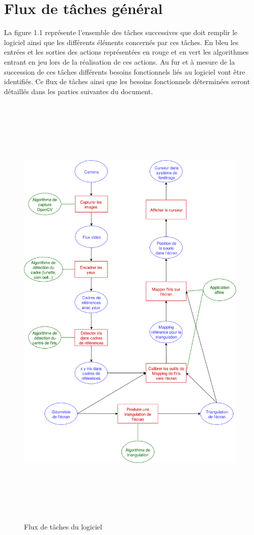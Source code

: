 \documentclass[a4paper, 12pt]{report}
\begin{document}
    \section*{Flux de tâches général}
    La figure 1.1 représente l'ensemble des tâches successives que doit remplir le logiciel ainsi que les différents éléments concernés par ces tâches. En bleu les entrées et les sorties des actions représentées en rouge et en vert les algorithmes entrant en jeu lors de la réalisation de ces actions. Au fur et à mesure de la succession de ces tâches différents besoins fonctionnels liés au logiciel vont être identifiés. Ce flux de tâches ainsi que les besoins fonctionnels déterminées seront détaillés dans les parties suivantes du document.
    \begin{figure}[!h]
    \centering\includegraphics[height=22cm]{workflow.png}
    \caption{Flux de tâches du logiciel}
    \end{figure}
\end{document}
